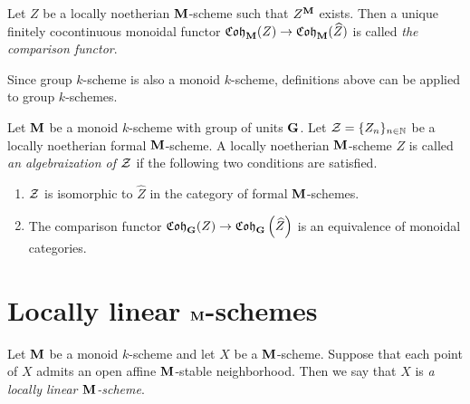 \begin{definition}
Let $Z$ be a locally noetherian $\mathbf{M}$-scheme such that $Z^{\mathbf{M}}$ exists. Then a unique finitely cocontinuous monoidal functor $\mathfrak{Coh}_{\mathbf{M}}(Z)\rightarrow \mathfrak{Coh}_{\mathbf{M}}(\widehat{Z})$ is called \textit{the comparison functor}.
\end{definition}
\noindent
Since group $k$-scheme is also a monoid $k$-scheme, definitions above can be applied to group $k$-schemes.

\begin{definition}
Let $\mathbf{M}$ be a monoid $k$-scheme with group of units $\mathbf{G}$. Let ${\mathcal Z} = \{Z_n\}_{n\in \mathbb{N}}$ be a locally noetherian formal $\mathbf{M}$-scheme. A locally noetherian $\mathbf{M}$-scheme $Z$ is called \textit{an algebraization of ${\mathcal Z}$} if the following two conditions are satisfied.
\begin{enumerate}[label=\textbf{(\arabic*)}, leftmargin=3.0em]
\item ${\mathcal Z}$ is isomorphic to $\widehat{Z}$ in the category of formal $\mathbf{M}$-schemes.
\item The comparison functor $\mathfrak{Coh}_{\mathbf{G}}(Z)\rightarrow \mathfrak{Coh}_{\mathbf{G}}\left(\widehat{Z}\right)$ is an equivalence of monoidal categories.
\end{enumerate}
\end{definition}

\section{Locally linear $\mathbf{M}$-schemes}

\begin{definition}
Let $\mathbf{M}$ be a monoid $k$-scheme and let $X$ be a $\mathbf{M}$-scheme. Suppose that each point of $X$ admits an open affine $\mathbf{M}$-stable neighborhood. Then we say that $X$ is \textit{a locally linear $\mathbf{M}$-scheme}.
\end{definition}

